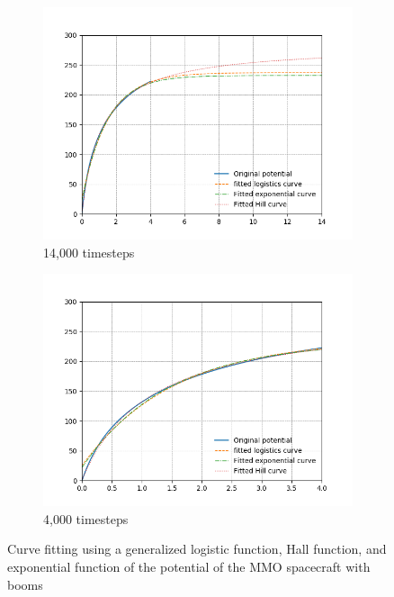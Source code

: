 \begin{center}
\begin{figure}[H]
  \begin{subfigure}[b]{0.61\textwidth}
    \includegraphics[width=\textwidth]{figures/Appendix/C_fit_WB.png}
    \caption{14,000 timesteps}
    \label{fig:C_fit_NB}
  \end{subfigure}
  \hfill
  \begin{subfigure}[b]{0.61\textwidth}
    \includegraphics[width=\textwidth]{figures/Appendix/C_fit_WB_lim.png}
    \caption{4,000 timesteps}
    \label{fig:C_fit_NB_lim}
  \end{subfigure}
  \label{fig:Pot_noPH}
  \caption{Curve fitting using a generalized logistic function, Hall function, and exponential function of the potential of the MMO spacecraft with booms}
\end{figure}
\end{center}


